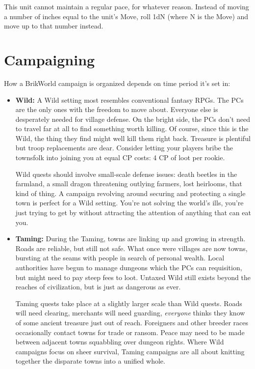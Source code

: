 \documentclass[12pt,a4paper,twocolumn]{article}
\begin{document}
This unit cannot maintain a regular pace, for whatever reason.  Instead of moving a number of inches equal to the unit's Move, roll 1dN (where N is the Move) and move up to that number instead.


\section {Campaigning }

How a BrikWorld campaign is organized depends on time period it's set in:
\begin{itemize}
\item {\bf Wild:} A Wild setting most resembles conventional fantasy RPGs.  The PCs are the only ones with the freedom to move about.  Everyone else is desperately needed for village defense.  On the bright side, the PCs don't need to travel far at all to find something worth killing.  Of course, since this is the Wild, the thing they find might well kill them right back.  Treasure is plentiful but troop replacements are dear.  Consider letting your players bribe the townsfolk into joining you at equal CP costs: 4 CP of loot per rookie.  

Wild quests should involve small-scale defense issues: death beetles in the farmland, a small dragon threatening outlying farmers, lost heirlooms, that kind of thing.  A campaign revolving around securing and protecting a single town is perfect for a Wild setting.  You're not solving the world's ills, you're just trying to get by without attracting the attention of anything that can eat you.

\item {\bf Taming:} During the Taming, towns are linking up and growing in strength.  Roads are reliable, but still not safe.  What once were villages are now towns, bursting at the seams with people in search of personal wealth.  Local authorities have begun to manage dungeons which the PCs can requisition, but might need to pay steep fees to loot. Untaxed Wild still exists beyond the reaches of civilization, but is just as dangerous as ever.  

Taming quests take place at a slightly larger scale than Wild quests.  Roads will need clearing, merchants will need guarding, {\it everyone} thinks they know of some ancient treasure just out of reach.  Foreigners and other breeder races occasionally contact towns for trade or ransom.  Peace may need to be made between adjacent towns squabbling over dungeon rights.  Where Wild campaigns focus on sheer survival, Taming campaigns are all about knitting together the disparate towns into a unified whole.


\end{itemize}
\end{document}
